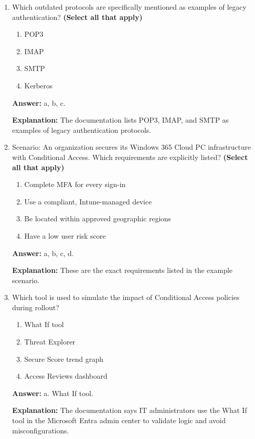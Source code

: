 \documentclass[10pt]{article}
\begin{document}
\begin{enumerate}[leftmargin=*]
\textbf{Explanation:} These seven examples are all listed in the documentation under commonly used Conditional Access policies.

\item Which outdated protocols are specifically mentioned as examples of legacy authentication? \textbf{(Select all that apply)}
\begin{enumerate}[label=\alph*., leftmargin=1.5em]
\item POP3
\item IMAP
\item SMTP
\item Kerberos
\end{enumerate}
\textbf{Answer:} a, b, c.

\textbf{Explanation:} The documentation lists POP3, IMAP, and SMTP as examples of legacy authentication protocols.

\item Scenario: An organization secures its Windows 365 Cloud PC infrastructure with Conditional Access. Which requirements are explicitly listed? \textbf{(Select all that apply)}
\begin{enumerate}[label=\alph*., leftmargin=1.5em]
\item Complete MFA for every sign-in
\item Use a compliant, Intune-managed device
\item Be located within approved geographic regions
\item Have a low user risk score
\end{enumerate}
\textbf{Answer:} a, b, c, d.

\textbf{Explanation:} These are the exact requirements listed in the example scenario.

\item Which tool is used to simulate the impact of Conditional Access policies during rollout?
\begin{enumerate}[label=\alph*., leftmargin=1.5em]
\item What If tool
\item Threat Explorer
\item Secure Score trend graph
\item Access Reviews dashboard
\end{enumerate}
\textbf{Answer:} a. What If tool.

\textbf{Explanation:} The documentation says IT administrators use the What If tool in the Microsoft Entra admin center to validate logic and avoid misconfigurations.


\end{enumerate}
\end{document}
